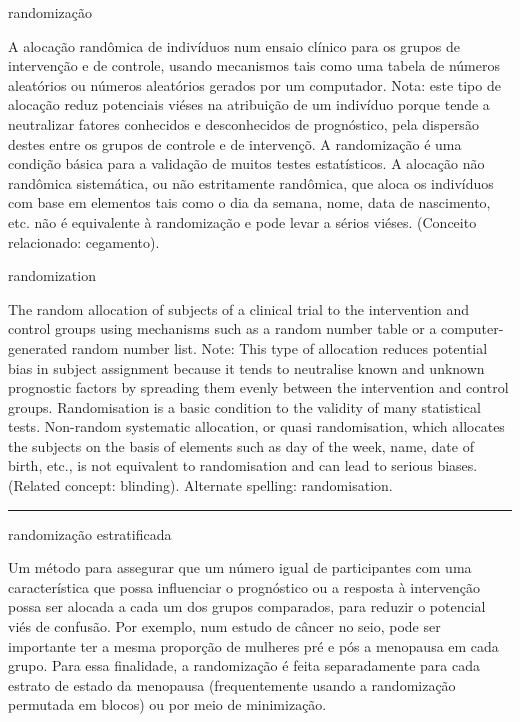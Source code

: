 \documentclass[
  openany]{book}
\begin{document}
randomização

A alocação randômica de indivíduos num ensaio clínico para os grupos de intervenção e de controle, usando mecanismos tais como uma tabela de números aleatórios ou números aleatórios gerados por um computador. Nota: este tipo de alocação reduz potenciais viéses na atribuição de um indivíduo porque tende a neutralizar fatores conhecidos e desconhecidos de prognóstico, pela dispersão destes entre os grupos de controle e de intervençõ. A randomização é uma condição básica para a validação de muitos testes estatísticos. A alocação não randômica sistemática, ou não estritamente randômica, que aloca os indivíduos com base em elementos tais como o dia da semana, nome, data de nascimento, etc. não é equivalente à randomização e pode levar a sérios viéses. (Conceito relacionado: cegamento).

randomization

The random allocation of subjects of a clinical trial to the intervention and control groups using mechanisms such as a random number table or a computer-generated random number list. Note: This type of allocation reduces potential bias in subject assignment because it tends to neutralise known and unknown prognostic factors by spreading them evenly between the intervention and control groups. Randomisation is a basic condition to the validity of many statistical tests. Non-random systematic allocation, or quasi randomisation, which allocates the subjects on the basis of elements such as day of the week, name, date of birth, etc., is not equivalent to randomisation and can lead to serious biases. (Related concept: blinding). Alternate spelling: randomisation.

\begin{center}\rule{0.5\linewidth}{0.5pt}\end{center}

randomização estratificada

Um método para assegurar que um número igual de participantes com uma característica que possa influenciar o prognóstico ou a resposta à intervenção possa ser alocada a cada um dos grupos comparados, para reduzir o potencial viés de confusão. Por exemplo, num estudo de câncer no seio, pode ser importante ter a mesma proporção de mulheres pré e pós a menopausa em cada grupo. Para essa finalidade, a randomização é feita separadamente para cada estrato de estado da menopausa (frequentemente usando a randomização permutada em blocos) ou por meio de minimização.
\end{document}

